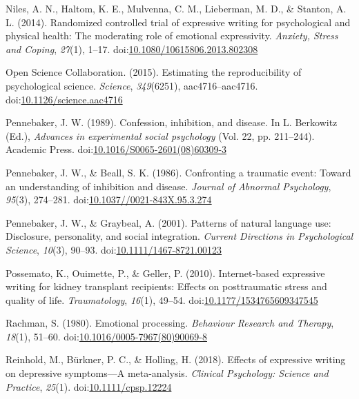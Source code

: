 \documentclass[man]{apa6}
\theoremstyle{definition}
\theoremstyle{definition}
\theoremstyle{definition}
\theoremstyle{remark}
\begin{document}
\hypertarget{ref-Niles2014}{}
Niles, A. N., Haltom, K. E., Mulvenna, C. M., Lieberman, M. D., \&
Stanton, A. L. (2014). Randomized controlled trial of expressive writing
for psychological and physical health: The moderating role of emotional
expressivity. \emph{Anxiety, Stress and Coping}, \emph{27}(1), 1--17.
doi:\href{https://doi.org/10.1080/10615806.2013.802308}{10.1080/10615806.2013.802308}

\hypertarget{ref-OpenScienceCollaboration2015}{}
Open Science Collaboration. (2015). Estimating the reproducibility of
psychological science. \emph{Science}, \emph{349}(6251),
aac4716--aac4716.
doi:\href{https://doi.org/10.1126/science.aac4716}{10.1126/science.aac4716}

\hypertarget{ref-Pennebaker1989}{}
Pennebaker, J. W. (1989). Confession, inhibition, and disease. In L.
Berkowitz (Ed.), \emph{Advances in experimental social psychology} (Vol.
22, pp. 211--244). Academic Press.
doi:\href{https://doi.org/10.1016/S0065-2601(08)60309-3}{10.1016/S0065-2601(08)60309-3}

\hypertarget{ref-Pennebaker1986}{}
Pennebaker, J. W., \& Beall, S. K. (1986). Confronting a traumatic
event: Toward an understanding of inhibition and disease. \emph{Journal
of Abnormal Psychology}, \emph{95}(3), 274--281.
doi:\href{https://doi.org/10.1037//0021-843X.95.3.274}{10.1037//0021-843X.95.3.274}

\hypertarget{ref-Pennebaker2001}{}
Pennebaker, J. W., \& Graybeal, A. (2001). Patterns of natural language
use: Disclosure, personality, and social integration. \emph{Current
Directions in Psychological Science}, \emph{10}(3), 90--93.
doi:\href{https://doi.org/10.1111/1467-8721.00123}{10.1111/1467-8721.00123}

\hypertarget{ref-Possemato2010}{}
Possemato, K., Ouimette, P., \& Geller, P. (2010). Internet-based
expressive writing for kidney transplant recipients: Effects on
posttraumatic stress and quality of life. \emph{Traumatology},
\emph{16}(1), 49--54.
doi:\href{https://doi.org/10.1177/1534765609347545}{10.1177/1534765609347545}

\hypertarget{ref-Rachman1980}{}
Rachman, S. (1980). Emotional processing. \emph{Behaviour Research and
Therapy}, \emph{18}(1), 51--60.
doi:\href{https://doi.org/10.1016/0005-7967(80)90069-8}{10.1016/0005-7967(80)90069-8}

\hypertarget{ref-Reinhold2018}{}
Reinhold, M., Bürkner, P. C., \& Holling, H. (2018). Effects of
expressive writing on depressive symptoms---A meta-analysis.
\emph{Clinical Psychology: Science and Practice}, \emph{25}(1).
doi:\href{https://doi.org/10.1111/cpsp.12224}{10.1111/cpsp.12224}
\end{document}
